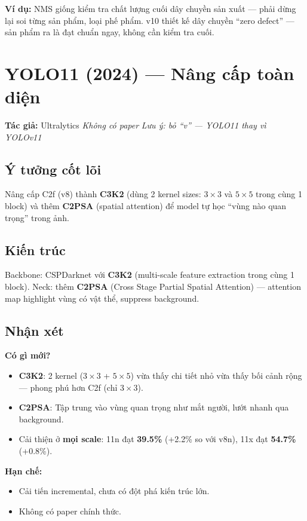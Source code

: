 \documentclass[12pt,a4paper]{report}
\begin{document}
\textbf{Ví dụ:} NMS giống kiểm tra chất lượng cuối dây chuyền sản xuất --- phải dừng lại soi từng sản phẩm, loại phế phẩm. v10 thiết kế dây chuyền ``zero defect'' --- sản phẩm ra là đạt chuẩn ngay, không cần kiểm tra cuối.

\section{YOLO11 (2024) --- Nâng cấp toàn diện}
\textbf{Tác giả:} Ultralytics \hfill \textit{Không có paper} \hfill \textit{Lưu ý: bỏ ``v'' --- YOLO11 thay vì YOLOv11}

\subsection{Ý tưởng cốt lõi}
Nâng cấp C2f (v8) thành \textbf{C3K2} (dùng 2 kernel sizes: $3\times3$ và $5\times5$ trong cùng 1 block) và thêm \textbf{C2PSA} (spatial attention) để model tự học ``vùng nào quan trọng'' trong ảnh.

\subsection{Kiến trúc}
Backbone: CSPDarknet với \textbf{C3K2} (multi-scale feature extraction trong cùng 1 block). Neck: thêm \textbf{C2PSA} (Cross Stage Partial Spatial Attention) --- attention map highlight vùng có vật thể, suppress background.

\subsection{Nhận xét}

\textbf{Có gì mới?}
\begin{itemize}
    \item \textbf{C3K2}: 2 kernel ($3\times3$ + $5\times5$) vừa thấy chi tiết nhỏ vừa thấy bối cảnh rộng --- phong phú hơn C2f (chỉ $3\times3$).
    \item \textbf{C2PSA}: Tập trung vào vùng quan trọng như mắt người, lướt nhanh qua background.
    \item Cải thiện ở \textbf{mọi scale}: 11n đạt \textbf{39.5\%} (+2.2\% so với v8n), 11x đạt \textbf{54.7\%} (+0.8\%).
\end{itemize}

\textbf{Hạn chế:}
\begin{itemize}
    \item Cải tiến incremental, chưa có đột phá kiến trúc lớn.
    \item Không có paper chính thức.
\end{itemize}
\end{document}
